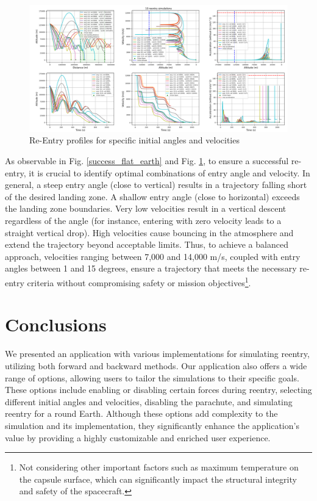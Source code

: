 \documentclass[runningheads]{llncs}
\begin{document}
\begin{figure}
\centering
\includegraphics[width=1\textwidth]{images/sim_results_sample.png}
\caption{Re-Entry profiles for specific initial angles and velocities} \label{sim_results_sample}
\end{figure}

As observable in Fig. \ref{success_flat_earth} and Fig. \ref{sim_results_sample}, to ensure a successful re-entry, it is crucial to identify optimal combinations of entry angle and velocity. In general, a steep entry angle (close to vertical) results in a trajectory falling short of the desired landing zone. A shallow entry angle (close to horizontal) exceeds the landing zone boundaries. Very low velocities result in a vertical descent regardless of the angle (for instance, entering with zero velocity leads to a straight vertical drop). High velocities cause bouncing in the atmosphere and extend the trajectory beyond acceptable limits.
Thus, to achieve a balanced approach, velocities ranging between 7,000 and 14,000 m/s, coupled with entry angles between 1 and 15 degrees, ensure a trajectory that meets the necessary re-entry criteria without compromising safety or mission objectives\footnote{Not considering other important factors such as maximum temperature on the capsule surface, which can significantly impact the structural integrity and safety of the spacecraft.}.







\section{Conclusions}

We presented an application with various implementations for simulating reentry, utilizing both forward and backward methods. Our application also offers a wide range of options, allowing users to tailor the simulations to their specific goals. These options include enabling or disabling certain forces during reentry, selecting different initial angles and velocities, disabling the parachute, and simulating reentry for a round Earth. Although these options add complexity to the simulation and its implementation, they significantly enhance the application's value by providing a highly customizable and enriched user experience.
\end{document}
